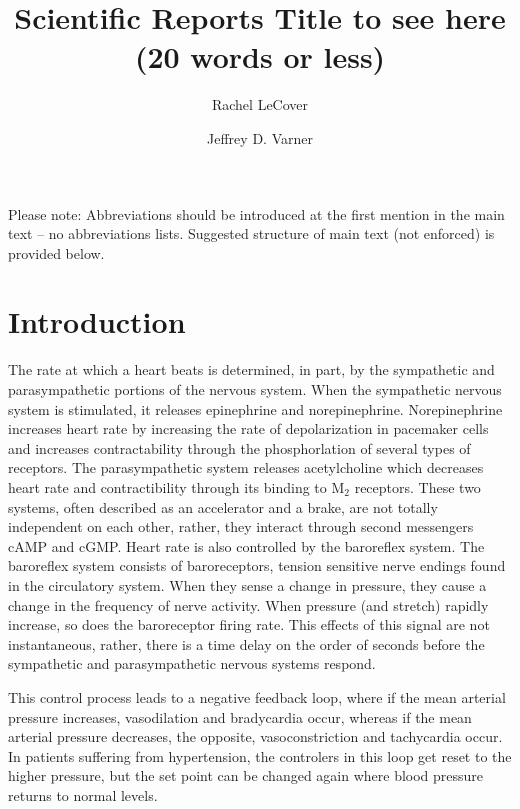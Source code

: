\documentclass[fleqn,10pt]{wlscirep}
\title{Scientific Reports Title to see here (20 words or less)}
\author[1]{Rachel LeCover}
\author[1,*]{Jeffrey D. Varner}
\affil[1]{Affiliation, School of Chemical and Biomolecular Engineering, Ithaca NY, 14852, USA}
\affil[*]{jdv27@cornell.edu}
\begin{document}
\flushbottom
\maketitle
%
%
\thispagestyle{empty}
\noindent Please note: Abbreviations should be introduced at the first mention in the main text – no abbreviations lists. Suggested structure of main text (not enforced) is provided below.
\section*{Introduction}
The rate at which a heart beats is determined, in part, by the sympathetic and parasympathetic portions of the nervous system. When the sympathetic nervous system is stimulated, it releases epinephrine and norepinephrine. Norepinephrine increases heart rate by increasing the rate of depolarization in pacemaker cells and increases contractability through the phosphorlation of several types of receptors.\cite{boron2016medical} The parasympathetic system releases acetylcholine which decreases heart rate and contractibility through its binding to M$_2$ receptors.  These two systems, often described as an accelerator and a brake, are not totally independent on each other, rather, they interact through second messengers cAMP and cGMP. \cite{olshansky2008parasympathetic}
Heart rate is also controlled by the baroreflex system. The baroreflex system consists of baroreceptors, tension sensitive nerve endings found in the circulatory system. \cite{ottesen1997modelling} When they sense a change in pressure, they cause a change in the frequency of nerve activity. When pressure (and stretch) rapidly increase, so does the baroreceptor firing rate. \cite{negative1999reflexes} This effects of this signal are not instantaneous, rather, there is a time delay on the order of seconds before the sympathetic and parasympathetic nervous systems respond. \cite{ottesen1997modelling}

This control process leads to a negative feedback loop, where if the mean arterial pressure increases, vasodilation and bradycardia occur, whereas if the mean arterial pressure decreases, the opposite, vasoconstriction and tachycardia occur. \cite{boron2016medical} In patients suffering from hypertension, the controlers in this loop get reset to the higher pressure, but the set point can be changed again where blood pressure returns to normal levels. \cite{oparil2003pathogenesis}
\end{document}
